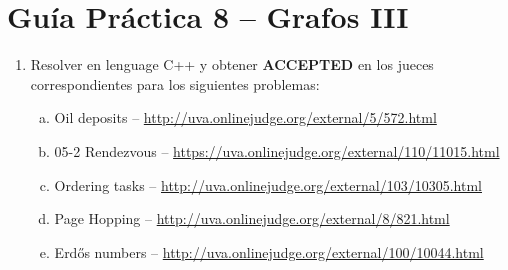 




\section*{Gu\'ia Pr\'actica 8 -- Grafos III}

\begin{enumerate}[1 -]
	
	\item Resolver en lenguage C++ y obtener \textbf{ACCEPTED} en los jueces correspondientes para los siguientes problemas:
	
	\begin{enumerate}[a)]
		\item Oil deposits -- \href{http://uva.onlinejudge.org/external/5/572.html}{http://uva.onlinejudge.org/external/5/572.html}		
		\item 05-2 Rendezvous -- \href{https://uva.onlinejudge.org/external/110/11015.html}{https://uva.onlinejudge.org/external/110/11015.html}				
		\item Ordering tasks -- \href{http://uva.onlinejudge.org/external/103/10305.html}{http://uva.onlinejudge.org/external/103/10305.html}		
		\item Page Hopping -- \href{http://uva.onlinejudge.org/external/8/821.html}{http://uva.onlinejudge.org/external/8/821.html}		
		\item Erd\H{o}s numbers -- \href{http://uva.onlinejudge.org/external/100/10044.html}{http://uva.onlinejudge.org/external/100/10044.html}		
		
	
	

	\end{enumerate}
\end{enumerate}

